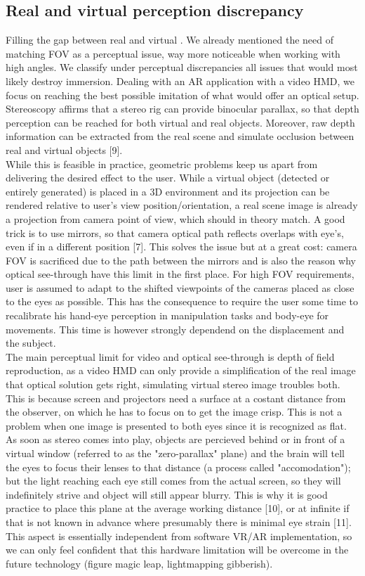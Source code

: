 \subsection{Real and virtual perception discrepancy}
Filling the gap between real and virtual . We already mentioned the need of matching FOV as a perceptual issue, way more noticeable when working with high angles. We classify under perceptual discrepancies all issues that would most likely destroy immersion. Dealing with an AR application with a video HMD, we focus on reaching the best possible imitation of what would offer an optical setup. Stereoscopy affirms that a stereo rig can provide binocular parallax, so that depth perception can be reached for both virtual and real objects. Moreover, raw depth information can be extracted from the real scene and simulate occlusion between real and virtual objects [9].\\
While this is feasible in practice, geometric problems keep us apart from delivering the desired effect to the user. While a virtual object (detected or entirely generated) is placed in a 3D environment and its projection can be rendered relative to user’s view position/orientation, a real scene image is already a projection from camera point of view, which should in theory match. A good trick is to use mirrors, so that camera optical path reflects overlaps with eye’s, even if in a different position [7]. This solves the issue but at a great cost: camera FOV is sacrificed due to the path between the mirrors and is also the reason why optical see-through have this limit in the first place. For high FOV requirements, user is assumed to adapt to the shifted viewpoints of the cameras placed as close to the eyes as possible. This has the consequence to require the user some time to recalibrate his hand-eye perception in manipulation tasks and body-eye for movements. This time is however strongly dependend on the displacement and the subject.\\
The main perceptual limit for video and optical see-through is depth of field reproduction, as a video HMD can only provide a simplification of the real image that optical solution gets right, simulating virtual stereo image troubles both. This is because screen and projectors need a surface at a costant distance from the observer, on which he has to focus on to get the image crisp. This is not a problem when one image is presented to both eyes since it is recognized as flat. As soon as stereo comes into play, objects are percieved behind or in front of a virtual window (referred to as the "zero-parallax" plane) and the brain will tell the eyes to focus their lenses to that distance (a process called "accomodation"); but the light reaching each eye still comes from the actual screen, so they will indefinitely strive and object will still appear blurry. This is why it is good practice to place this plane at the average working distance [10], or at infinite if that is not known in advance where presumably there is minimal eye strain [11]. This aspect is essentially independent from software VR/AR implementation, so we can only feel confident that this hardware limitation will be overcome in the future technology (figure magic leap, lightmapping gibberish).

